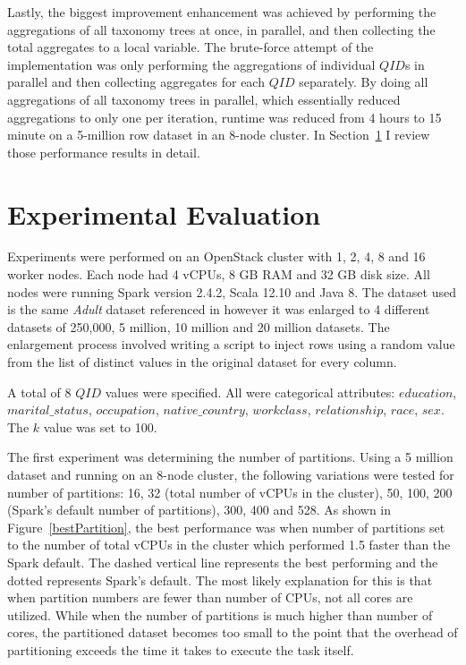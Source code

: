 \documentclass[11pt]{article}       %
\newcommand{\includeFig}[3]      {\begin{figure}[htb] \begin{center}
                                 \includegraphics
                                 [width=4in,keepaspectratio] %
                                 {#2}\caption{\label{#1}#3} \end{center} \end{figure}}
\begin{document}
Lastly, the biggest improvement enhancement was achieved by performing the aggregations of all taxonomy trees at once, in parallel, and then collecting the total aggregates to a local variable. The brute-force attempt of the implementation was only performing the aggregations of individual $QID$s in parallel and then collecting aggregates for each $QID$ separately. By doing all aggregations of all taxonomy trees in parallel, which essentially reduced aggregations to only one per iteration, runtime was reduced from 4 hours to 15 minute on a 5-million row dataset in an 8-node cluster. In Section~\ref{evaluation} I review those performance results in detail.


\section{Experimental Evaluation} \label{evaluation}

Experiments were performed on an OpenStack cluster with 1, 2, 4, 8 and 16 worker nodes. Each node had 4 vCPUs, 8 GB RAM and 32 GB disk size. All nodes were running Spark version 2.4.2, Scala 12.10 and Java 8. The dataset used is the same \emph{Adult} dataset referenced in \cite{Sopaoglu:2017} however it was enlarged to 4 different datasets of 250,000, 5 million, 10 million and 20 million datasets. The enlargement process involved writing a script to inject rows using a random value from the list of distinct values in the original dataset for every column.

A total of 8 $QID$ values were specified. All were categorical attributes: $education$, $marital\_status$, $occupation$, $native\_country$, $workclass$, $relationship$, $race$, $sex$. The $k$ value was set to 100.

The first experiment was determining the number of partitions. Using a 5 million dataset and running on an 8-node cluster, the following variations were tested for number of partitions: 16, 32 (total number of vCPUs in the cluster), 50, 100, 200 (Spark's default number of partitions), 300, 400 and 528. As shown in Figure~\ref{bestPartition}, the best performance was when number of partitions set to the number of total vCPUs in the cluster which performed 1.5 faster than the Spark default. The dashed vertical line represents the best performing and the dotted represents Spark's default. The most likely explanation for this is that when partition numbers are fewer than number of CPUs, not all cores are utilized. While when the number of partitions is much higher than number of cores, the partitioned dataset becomes too small to the point that the overhead of partitioning exceeds the time it takes to execute the task itself.
\end{document}
